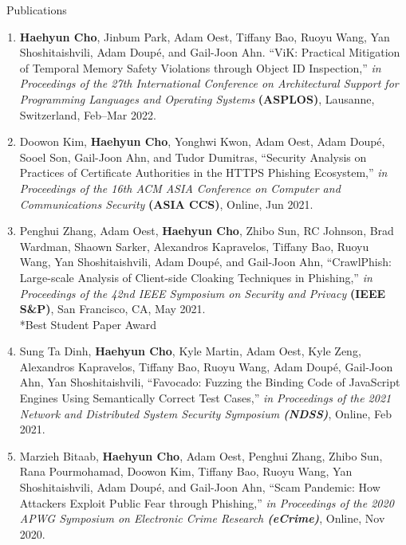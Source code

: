 \documentclass{resume} %
\begin{document}
\begin{rSection}{\faGenderless~Publications}
\begin{enumerate}[leftmargin=0pt]
		\item \textbf{Haehyun Cho}, Jinbum Park, Adam Oest, Tiffany Bao, Ruoyu Wang, Yan Shoshitaishvili, Adam Doup\'e, and Gail-Joon Ahn.
		``ViK: Practical Mitigation of Temporal Memory Safety Violations through Object ID Inspection,'' 
		\emph{in Proceedings of the 27th International Conference on Architectural Support for Programming Languages and Operating Systems} \textbf{(ASPLOS)},
		Lausanne, Switzerland, Feb--Mar 2022.

    	\item Doowon Kim, \textbf{Haehyun Cho}, Yonghwi Kwon, Adam Oest, Adam Doup\'e, Sooel Son, Gail-Joon Ahn, and Tudor Dumitras,
    	``Security Analysis on Practices of Certificate Authorities in the HTTPS Phishing Ecosystem,''
    	\emph{in Proceedings of the 16th ACM ASIA Conference on Computer and Communications Security} \textbf{(ASIA CCS)},
    	Online, Jun 2021.

    	\item Penghui Zhang, Adam Oest, \textbf{Haehyun Cho}, Zhibo Sun, RC Johnson, Brad Wardman, Shaown Sarker, Alexandros Kapravelos, Tiffany Bao, Ruoyu Wang, Yan Shoshitaishvili, Adam Doup\'e, and Gail-Joon Ahn,
    	``CrawlPhish: Large-scale Analysis of Client-side Cloaking Techniques in Phishing,''
        \emph{in Proceedings of the 42nd IEEE Symposium on Security and Privacy} \textbf{(IEEE S\&P)},
    	San Francisco, CA, May 2021.\\
        {*}Best Student Paper Award

    	\item Sung Ta Dinh, \textbf{Haehyun Cho}, Kyle Martin, Adam Oest, Kyle Zeng, Alexandros Kapravelos, Tiffany Bao, Ruoyu Wang, Adam Doup\'e, Gail-Joon Ahn, Yan Shoshitaishvili,
        ``Favocado: Fuzzing the Binding Code of JavaScript Engines Using Semantically Correct Test Cases,''
        \emph{in Proceedings of the 2021 Network and Distributed System Security Symposium \textbf{(NDSS)}},
        Online, Feb 2021.

        \item Marzieh Bitaab, \textbf{Haehyun Cho}, Adam Oest, Penghui Zhang, Zhibo Sun, Rana Pourmohamad, Doowon Kim, Tiffany Bao, Ruoyu Wang, Yan Shoshitaishvili, Adam Doup\'e, and Gail-Joon Ahn,
        ``Scam Pandemic: How Attackers Exploit Public Fear through Phishing,''
        \emph{in Proceedings of the 2020 APWG Symposium on Electronic Crime Research \textbf{(eCrime)}},
        Online, Nov 2020.


\end{enumerate}
\end{rSection}
\end{document}
